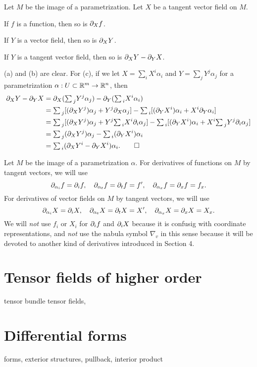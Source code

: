 \documentclass{../note}
\def\a{\alpha}
\def\ssum{{\textstyle\sum\,}}
\begin{document}
\begin{prb}
Let $M$ be the image of a parametrization.
Let $X$ be a tangent vector field on $M$.
\begin{parts}
\item If $f$ is a function, then so is $\pd_Xf$.
\item If $Y$ is a vector field, then so is $\pd_XY$.
\item If $Y$ is a tangent vector field, then so is $\pd_XY-\pd_YX$.
\end{parts}
\end{prb}
\begin{pf}
(a) and (b) are clear.
For (c), if we let $X=\sum_iX^i\a_i$ and $Y=\sum_jY^j\a_j$ for a parametrization $\a:U\subset\R^m\to\R^n$, then
\begin{align*}
\pd_XY-\pd_YX
&=\pd_X(\ssum_jY^j\a_j)-\pd_Y(\ssum_iX^i\a_i)\\
&=\ssum_j[(\pd_XY^j)\a_j+Y^j\pd_X\a_j]-\ssum_i[(\pd_YX^i)\a_i+X^i\pd_Y\a_i]\\
&=\ssum_j[(\pd_XY^j)\a_j+Y^j\ssum_iX^i\pd_i\a_j]-\ssum_i[(\pd_YX^i)\a_i+X^i\ssum_jY^j\pd_i\a_j]\\
&=\ssum_j(\pd_XY^j)\a_j-\ssum_i(\pd_YX^i)\a_i\\
&=\ssum_i(\pd_XY^i-\pd_YX^i)\a_i.\qedhere
\end{align*}
\end{pf}

\begin{prb}
Let $M$ be the image of a parametrization $\a$.
For derivatives of functions on $M$ by tangent vectors, we will use
\[\pd_{\a_i}f=\pd_if,\quad\pd_{\a_t}f=\pd_tf=f',\quad\pd_{\a_x}f=\pd_xf=f_x.\]
For derivatives of vector fields on $M$ by tangent vectors, we will use
\[\pd_{\a_i}X=\pd_iX,\quad\pd_{\a_t}X=\pd_tX=X',\quad\pd_{\a_x}X=\pd_xX=X_x.\]
We will \emph{not} use $f_i$ or $X_i$ for $\pd_if$ and $\pd_iX$ because it is confusig with coordinate representations, and \emph{not} use the nabula symbol $\nabla_v$ in this sense because it will be devoted to another kind of derivatives introduced in Section 4.
\end{prb}

\section{Tensor fields of higher order}
tensor bundle
tensor fields,

\section{Differential forms}
forms, exterior structures, pullback, interior product
\end{document}
